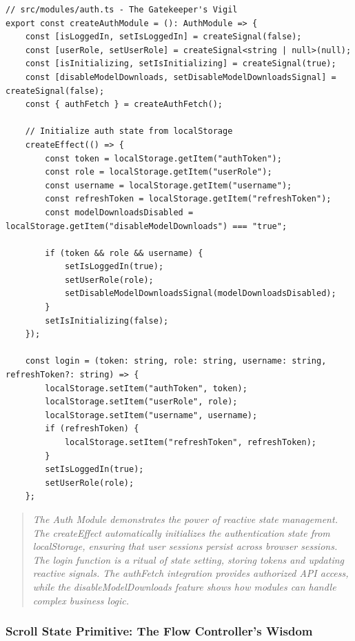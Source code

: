 \documentclass[11pt]{article}
\begin{document}
\begin{lstlisting}[style=typescript]
// src/modules/auth.ts - The Gatekeeper's Vigil
export const createAuthModule = (): AuthModule => {
    const [isLoggedIn, setIsLoggedIn] = createSignal(false);
    const [userRole, setUserRole] = createSignal<string | null>(null);
    const [isInitializing, setIsInitializing] = createSignal(true);
    const [disableModelDownloads, setDisableModelDownloadsSignal] = createSignal(false);
    const { authFetch } = createAuthFetch();

    // Initialize auth state from localStorage
    createEffect(() => {
        const token = localStorage.getItem("authToken");
        const role = localStorage.getItem("userRole");
        const username = localStorage.getItem("username");
        const refreshToken = localStorage.getItem("refreshToken");
        const modelDownloadsDisabled = localStorage.getItem("disableModelDownloads") === "true";

        if (token && role && username) {
            setIsLoggedIn(true);
            setUserRole(role);
            setDisableModelDownloadsSignal(modelDownloadsDisabled);
        }
        setIsInitializing(false);
    });

    const login = (token: string, role: string, username: string, refreshToken?: string) => {
        localStorage.setItem("authToken", token);
        localStorage.setItem("userRole", role);
        localStorage.setItem("username", username);
        if (refreshToken) {
            localStorage.setItem("refreshToken", refreshToken);
        }
        setIsLoggedIn(true);
        setUserRole(role);
    };
\end{lstlisting}

\begin{quote}
\emph{The Auth Module demonstrates the power of reactive state management. The createEffect automatically initializes the authentication state from localStorage, ensuring that user sessions persist across browser sessions. The login function is a ritual of state setting, storing tokens and updating reactive signals. The authFetch integration provides authorized API access, while the disableModelDownloads feature shows how modules can handle complex business logic.}
\end{quote}

\subsubsection{Scroll State Primitive: The Flow Controller's Wisdom}
\end{document}
